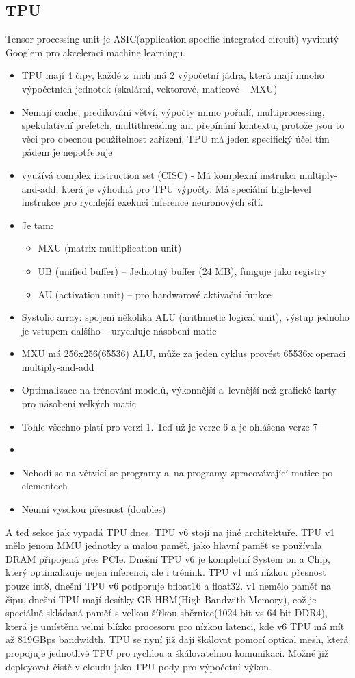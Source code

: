 \subsection{TPU}
Tensor processing unit je ASIC(application-specific integrated circuit) vyvinutý Googlem pro akceleraci machine learningu.
\begin{itemize}
    \item TPU mají 4 čipy, každé z~nich má 2 výpočetní jádra, která mají mnoho výpočetních jednotek (skalární, vektorové, maticové -- MXU)
    \item Nemají cache, predikování větví, výpočty mimo pořadí, multiprocessing, spekulativní prefetch, multithreading ani přepínání kontextu, protože jsou to věci pro obecnou použitelnost zařízení, TPU má jeden specifický účel tím pádem je nepotřebuje
    \item využívá complex instruction set (CISC) - Má komplexní instrukci multiply-and-add, která je výhodná pro TPU výpočty. Má speciální high-level instrukce pro rychlejší exekuci inference neuronových sítí.
    \item Je tam:
    \begin{itemize}
        \item MXU (matrix multiplication unit)
        \item UB (unified buffer) -- Jednotný buffer (24 MB), funguje jako registry
        \item AU (activation unit) -- pro hardwarové aktivační funkce
    \end{itemize}
    \item Systolic array: spojení několika ALU (arithmetic logical unit), výstup jednoho je vstupem dalšího -- urychluje násobení matic
    \item MXU má 256x256(65536) ALU, může za jeden cyklus provést 65536x operaci multiply-and-add
    \item Optimalizace na trénování modelů, výkonnější a~levnější než grafické karty pro násobení velkých matic
    \item Tohle všechno platí pro verzi 1. Teď už je verze 6 a je ohlášena verze 7
    \item 
    \item Nehodí se na větvící se programy a~na programy zpracovávající matice po elementech
    \item Neumí vysokou přesnost (doubles)
\end{itemize}

A teď sekce jak vypadá TPU dnes. TPU v6 stojí na jiné architektuře. TPU v1 mělo jenom MMU jednotky a malou paměť, jako hlavní paměť se používala DRAM připojená přes PCIe. Dnešní TPU v6 je kompletní System on a Chip, který optimalizuje nejen inferenci, ale i trénink. TPU v1 má nízkou přesnost pouze int8, dnešní TPU v6 podporuje bfloat16 a float32. v1 nemělo paměť na čipu, dnešní TPU mají desítky GB HBM(High Bandwith Memory), což je speciálně skládaná paměť s velkou šířkou sběrnice(1024-bit vs 64-bit DDR4), která je umístěna velmi blízko procesoru pro nízkou latenci, kde v6 TPU má mít až 819GBps bandwidth. TPU se nyní již dají škálovat pomocí optical mesh, která propojuje jednotlivé TPU pro rychlou a škálovatelnou komunikaci. Možné již deployovat čistě v cloudu jako TPU pody pro výpočetní výkon.
